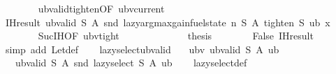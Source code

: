 \begin{isabellebody}
\ \ \ \ \ \ \isamarkupfalse%
\ ub{\isacharunderscore}{\kern0pt}valid{\isacharunderscore}{\kern0pt}tighten{\isacharbrackleft}{\kern0pt}OF\ ubv{\isacharunderscore}{\kern0pt}current{\isacharbrackright}{\kern0pt}\ \isakeywordONE{{\isachardot}{\kern0pt}}\isamarkupfalse%
\isanewline
\ \ \ \ \ \ \isanewline
\ \ \ \ \isamarkupfalse%
\ IH{\isacharunderscore}{\kern0pt}result{\isacharcolon}{\kern0pt}\ {\isachardoublequoteopen}ub{\isacharunderscore}{\kern0pt}valid\ S\ A\ {\isacharparenleft}{\kern0pt}snd\ {\isacharparenleft}{\kern0pt}lazy{\isacharunderscore}{\kern0pt}argmax{\isacharunderscore}{\kern0pt}gain{\isacharunderscore}{\kern0pt}fuel{\isacharunderscore}{\kern0pt}state\ n\ S\ A\ {\isacharparenleft}{\kern0pt}tighten\ S\ ub\ {\isacharquery}{\kern0pt}x{\isacharparenright}{\kern0pt}{\isacharparenright}{\kern0pt}{\isacharparenright}{\kern0pt}{\isachardoublequoteclose}\isanewline
\ \ \ \ \ \ \isamarkupfalse%
\ Suc{\isachardot}{\kern0pt}IH{\isacharbrackleft}{\kern0pt}OF\ ubv{\isacharunderscore}{\kern0pt}tight{\isacharbrackright}{\kern0pt}\ \isakeywordONE{{\isachardot}{\kern0pt}}\isamarkupfalse%
\isanewline
\ \ \ \ \ \ \isanewline
\ \ \ \ \isamarkupfalse%
\ {\isacharquery}{\kern0pt}thesis\isanewline
\ \ \ \ \ \ \isamarkupfalse%
\ False\ IH{\isacharunderscore}{\kern0pt}result\ \isamarkupfalse%
\ {\isacharparenleft}{\kern0pt}simp\ add{\isacharcolon}{\kern0pt}\ Let{\isacharunderscore}{\kern0pt}def{\isacharparenright}{\kern0pt}\isanewline
\ \ \isamarkupfalse%
\isanewline
{}\isamarkupfalse%
%
\endisatagproof
{\isafoldproof}%
%
\isadelimproof
\isanewline
%
\endisadelimproof
\isanewline
{}\isamarkupfalse%
\ lazy{\isacharunderscore}{\kern0pt}select{\isacharunderscore}{\kern0pt}ub{\isacharunderscore}{\kern0pt}valid{\isacharcolon}{\kern0pt}\isanewline
\ \ \ ubv{\isacharcolon}{\kern0pt}\ {\isachardoublequoteopen}ub{\isacharunderscore}{\kern0pt}valid\ S\ A\ ub{\isachardoublequoteclose}\isanewline
\ \ \ {\isachardoublequoteopen}ub{\isacharunderscore}{\kern0pt}valid\ S\ A\ {\isacharparenleft}{\kern0pt}snd\ {\isacharparenleft}{\kern0pt}lazy{\isacharunderscore}{\kern0pt}select\ S\ A\ ub{\isacharparenright}{\kern0pt}{\isacharparenright}{\kern0pt}{\isachardoublequoteclose}\isanewline
%
\isadelimproof
\ \ %
\endisadelimproof
%
\isatagproof
{}\isamarkupfalse%
\ lazy{\isacharunderscore}{\kern0pt}select{\isacharunderscore}{\kern0pt}def\isanewline
\ \ \isamarkupfalse%

\end{isabellebody}
